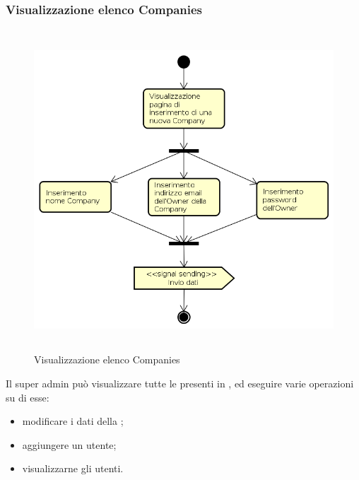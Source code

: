 \subsubsection{Visualizzazione elenco Companies}
\begin{figure}[H]
\begin{center}
\includegraphics[height=12cm]{res/sections/backend/activities/creazioneCompanySA.png}
\caption{Visualizzazione elenco Companies}
\end{center}
\end{figure}
Il super admin può visualizzare tutte le  presenti in , ed eseguire varie operazioni su di esse:
\begin{itemize}
\item modificare i dati della ;
\item aggiungere un utente;
\item visualizzarne gli utenti.
\end{itemize}
\newpage
